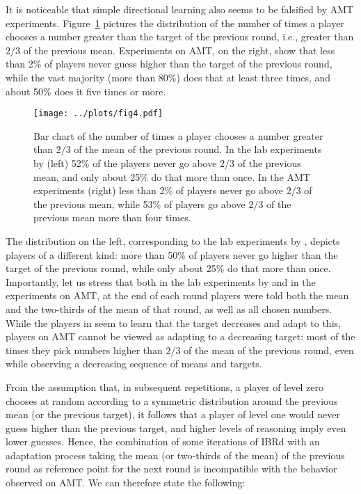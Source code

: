 \documentclass[12pt,review]{elsarticle}
\begin{document}
It is noticeable that simple directional learning also seems to be
falsified by AMT experiments. Figure~\ref{fig:above-2/3} pictures
the distribution of the number of times a player chooses a number
greater than the target of the previous round, i.e., greater than
$2/3$ of the previous mean. Experiments on AMT, on the right, show
that less than 2\% of players never guess higher than the target of
the previous round, while the vast majority (more than 80\%) does
that at least three times, and about 50\% does it five times or more.

\begin{figure}
\texttt{[image: ../plots/fig4.pdf]}
\caption{Bar chart of the number of times a player chooses a number greater
than $2/3$ of the mean of the previous round. In the lab experiments
by \citet{Nagel95} (left) 52\% of the players never go above $2/3$
of the previous mean, and only about 25\% do that more than once.
In the AMT experiments (right) less than 2\% of players never go above
$2/3$ of the previous mean, while 53\% of players go above $2/3$
of the previous mean more than four times.}
\label{fig:above-2/3}
\end{figure}

The distribution on the left, corresponding to the lab experiments
by \citet{Nagel95}, depicts players of a different kind: more than
50\% of players never go higher than the target of the previous round,
while only about 25\% do that more than once. Importantly, let us stress that both in
the lab experiments by \citet{Nagel95} and in the experiments on AMT,
at the end of each round players were told both the mean and the two-thirds
of the mean of that round, as well as all chosen numbers.%
{} While the players in \citet{Nagel95} seem to learn that the target
decreases and adapt to this, players on AMT cannot be viewed as adapting
to a decreasing target: most of the times they pick numbers higher
than $2/3$ of the mean of the previous round, even while observing
a decreasing sequence of means and targets.

From the assumption that, in subsequent repetitions, a player of level
zero chooses at random according to a symmetric distribution around
the previous mean (or the previous target), it follows that a player
of level one would never guess higher than the previous target, and
higher levels of reasoning imply even lower guesses. Hence, the combination
of some iterations of IBRd with an adaptation process taking the mean
(or two-thirds of the mean) of the previous round as reference point
for the next round is incompatible with the behavior observed on AMT.
We can therefore state the following:
\end{document}
